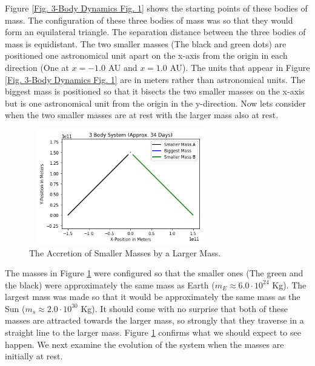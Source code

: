 \documentclass[twocolumn]{article}
\begin{document}
\par \noindent
Figure \ref{Fig. 3-Body Dynamics Fig. 1} shows the starting points of these bodies of mass. The configuration of these three bodies of mass was so that they would form an equilateral triangle. The separation distance between the three bodies of mass is equidistant. The two smaller masses (The black and green dots) are positioned one astronomical unit apart on the x-axis from the origin in each direction (One at $x=-1.0$ AU and $x=1.0$ AU). The units that appear in Figure \ref{Fig. 3-Body Dynamics Fig. 1} are in meters rather than astronomical units. The biggest mass is positioned so that it bisects the two smaller masses on the x-axis but is one astronomical unit from the origin in the y-direction. Now lets consider when the two smaller masses are at rest with the larger mass also at rest.
\begin{figure}[ht]
    \centering
    \includegraphics[width=8cm, height=5cm]{Figures/3-Body Dynamics (2).png}
    \caption{\small{The Accretion of Smaller Masses by a Larger Mass.}}
    \label{Fig. 3-Body Dynamics Fig. 2}
\end{figure}
\par \noindent
The masses in Figure \ref{Fig. 3-Body Dynamics Fig. 2} were configured so that the smaller ones (The green and the black) were approximately the same mass as Earth ($m_E\approx6.0\cdot10^{24}$ Kg). The largest mass was made so that it would be approximately the same mass as the Sun ($m_s\approx2.0\cdot10^{30}$ Kg). It should come with no surprise that both of these masses are attracted towards the larger mass, so strongly that they traverse in a straight line to the larger mass. Figure \ref{Fig. 3-Body Dynamics Fig. 2} confirms what we should expect to see happen. We next examine the evolution of the system when the masses are initially at rest.
\end{document}
